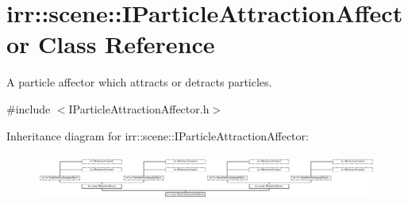 \hypertarget{classirr_1_1scene_1_1IParticleAttractionAffector}{}\section{irr\+:\+:scene\+:\+:I\+Particle\+Attraction\+Affector Class Reference}
\label{classirr_1_1scene_1_1IParticleAttractionAffector}


A particle affector which attracts or detracts particles.  




{\ttfamily \#include $<$I\+Particle\+Attraction\+Affector.\+h$>$}

Inheritance diagram for irr\+:\+:scene\+:\+:I\+Particle\+Attraction\+Affector\+:\begin{figure}[H]
\begin{center}
\leavevmode
\includegraphics[height=1.555556cm]{classirr_1_1scene_1_1IParticleAttractionAffector}
\end{center}
\end{figure}
